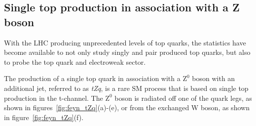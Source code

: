 \subsection{Single top production in association with a Z boson}\label{subsec:tZqTheory}
With the LHC producing unprecedented levels of top quarks, the statistics have become available to not only study singly and pair produced top quarks, but also to probe the top quark and electroweak sector.

The production of a single top quark in association with a $\text{Z}^0$ boson with an additional jet, referred to as \emph{tZq}, is a rare SM process that is based on single top production in the t-channel.
The $\text{Z}^0$ boson is radiated off one of the quark legs, as shown in figures~\ref{fig:feyn_tZq}(a)-(e), or from the exchanged W boson, as shown in figure~\ref{fig:feyn_tZq}(f).

